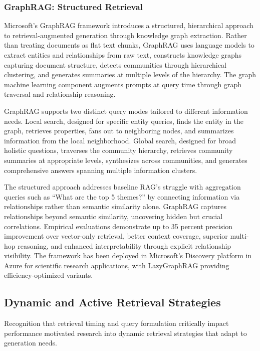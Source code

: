\subsubsection{GraphRAG: Structured Retrieval}

Microsoft's GraphRAG framework introduces a structured, hierarchical approach to retrieval-augmented generation through knowledge graph extraction. Rather than treating documents as flat text chunks, GraphRAG uses language models to extract entities and relationships from raw text, constructs knowledge graphs capturing document structure, detects communities through hierarchical clustering, and generates summaries at multiple levels of the hierarchy. The graph machine learning component augments prompts at query time through graph traversal and relationship reasoning.

GraphRAG supports two distinct query modes tailored to different information needs. Local search, designed for specific entity queries, finds the entity in the graph, retrieves properties, fans out to neighboring nodes, and summarizes information from the local neighborhood. Global search, designed for broad holistic questions, traverses the community hierarchy, retrieves community summaries at appropriate levels, synthesizes across communities, and generates comprehensive answers spanning multiple information clusters.

The structured approach addresses baseline RAG's struggle with aggregation queries such as ``What are the top 5 themes?'' by connecting information via relationships rather than semantic similarity alone. GraphRAG captures relationships beyond semantic similarity, uncovering hidden but crucial correlations. Empirical evaluations demonstrate up to 35 percent precision improvement over vector-only retrieval, better context coverage, superior multi-hop reasoning, and enhanced interpretability through explicit relationship visibility. The framework has been deployed in Microsoft's Discovery platform in Azure for scientific research applications, with LazyGraphRAG providing efficiency-optimized variants.

\subsection{Dynamic and Active Retrieval Strategies}

Recognition that retrieval timing and query formulation critically impact performance motivated research into dynamic retrieval strategies that adapt to generation needs.

